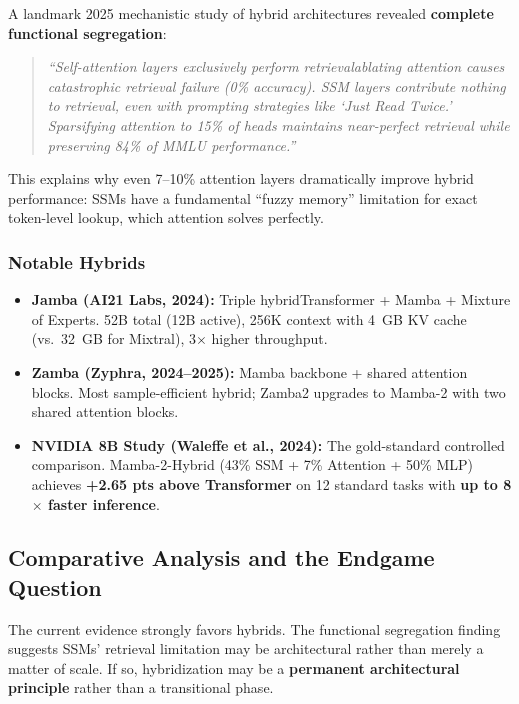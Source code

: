 \documentclass[11pt,a4paper]{article}
\begin{document}
A landmark 2025 mechanistic study of hybrid architectures revealed \textbf{complete functional segregation}:

\begin{quote}
\textit{``Self-attention layers exclusively perform retrieval\textemdash ablating attention causes catastrophic retrieval failure (0\% accuracy). SSM layers contribute nothing to retrieval, even with prompting strategies like `Just Read Twice.' Sparsifying attention to 15\% of heads maintains near-perfect retrieval while preserving 84\% of MMLU performance.''}
\end{quote}

This explains why even 7--10\% attention layers dramatically improve hybrid performance: SSMs have a fundamental ``fuzzy memory'' limitation for exact token-level lookup, which attention solves perfectly.

\subsubsection{Notable Hybrids}

\begin{itemize}[leftmargin=*]
    \item \textbf{Jamba (AI21 Labs, 2024):} Triple hybrid\textemdash Transformer + Mamba + Mixture of Experts. 52B total (12B active), 256K context with 4~GB KV cache (vs.\ 32~GB for Mixtral), 3$\times$ higher throughput.
    \item \textbf{Zamba (Zyphra, 2024--2025):} Mamba backbone + shared attention blocks. Most sample-efficient hybrid; Zamba2 upgrades to Mamba-2 with two shared attention blocks.
    \item \textbf{NVIDIA 8B Study (Waleffe et al., 2024):} The gold-standard controlled comparison. Mamba-2-Hybrid (43\% SSM + 7\% Attention + 50\% MLP) achieves \textbf{+2.65 pts above Transformer} on 12 standard tasks with \textbf{up to 8$\times$ faster inference}.
\end{itemize}

\subsection{Comparative Analysis and the Endgame Question}

The current evidence strongly favors hybrids. The functional segregation finding suggests SSMs' retrieval limitation may be architectural rather than merely a matter of scale. If so, hybridization may be a \textbf{permanent architectural principle} rather than a transitional phase.
\end{document}
